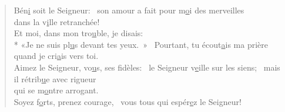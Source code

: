 \begin{verse}
Bén\underline{i} soit le Seigneur:~\psalmstar
son amour a fait pour m\underline{o}i des merveilles \\
dans la v\underline{i}lle retranchée! \\

Et moi, dans mon tro\underline{u}ble, je disais: \\*
«Je ne suis pl\underline{u}s devant tes yeux. »~\psalmstar
Pourtant, tu écout\underline{a}is ma prière \\
quand je cri\underline{a}is vers toi. \\

Aimez le Seigneur, vo\underline{u}s, ses fidèles:~\psalmdagger
le Seigneur v\underline{e}ille sur les siens;~\psalmstar
mais il rétrib\underline{u}e avec rigueur \\
qui se m\underline{o}ntre arrogant. \\

Soyez f\underline{o}rts, prenez courage,~\psalmstar
vous tous qui espér\underline{e}z le Seigneur! \\
\end{verse}

